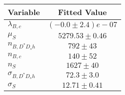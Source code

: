 \begin{tabular}[t]{lc}
\hline
Variable &Fitted Value\\
\hline\hline
$\lambda_{B,c}$&$(-0.0\pm2.4)e-07$\\
\hline
$\mu_S$&$5279.53\pm0.46$\\
\hline
$n_{B, D^* D_s h}$&$792\pm43$\\
\hline
$n_{B,c}$&$140\pm52$\\
\hline
$n_S$&$1627\pm40$\\
\hline
$\sigma_{B, D^* D_s h}$&$72.3\pm3.0$\\
\hline
$\sigma_S$&$12.71\pm0.41$\\
\hline
\end{tabular}
